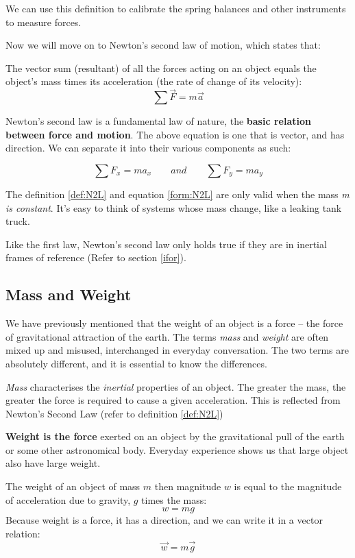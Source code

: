 We can use this definition to calibrate the spring balances and other instruments to measure forces.

Now we will move on to Newton's second law of motion, which states that:
\begin{defi} \label{def:N2L}
The vector sum (resultant) of all the forces acting on an object equals the object's mass times its acceleration (the rate of change of its velocity):
$$\sum \vec{F} = m \vec{a}$$
\end{defi}

Newton's second law is a fundamental law of nature, the \textbf{basic relation between force and motion}. The above equation is one that is vector, and has direction. We can separate it into their various components as such:

\begin{form} \label{form:N2L}
$$\sum F_x = m a_x \qquad and \qquad \sum F_y = m a_y$$
\end{form}

The definition \ref{def:N2L} and equation \ref{form:N2L} are only valid when the mass \emph{m is constant}. It's easy to think of systems whose mass change, like a leaking tank truck.

Like the first law, Newton's second law only holds true if they are in inertial frames of reference (Refer to section \ref{ifor}).

\subsection{Mass and Weight}
We have previously mentioned that the weight of an object is a force -- the force of gravitational attraction of the earth. The terms \emph{mass} and \emph{weight} are often mixed up and misused, interchanged in everyday conversation. The two terms are absolutely different, and it is essential to know the differences.

\emph{Mass} characterises the \textit{inertial} properties of an object. The greater the mass, the greater the force is required to cause a given acceleration. This is reflected from Newton's Second Law (refer to definition \ref{def:N2L})

\textbf{Weight is the force} exerted on an object by the gravitational pull of the earth or some other astronomical body. Everyday experience shows us that large object also have large weight.

\begin{defi}
The weight of an object of mass $m$ then magnitude $w$ is equal to the magnitude of acceleration due to gravity, $g$ times the mass:
$$w=mg$$
Because weight is a force, it has a direction, and we can write it in a vector relation:
$$\vec {w} = m \vec{g}$$	
\end{defi}

